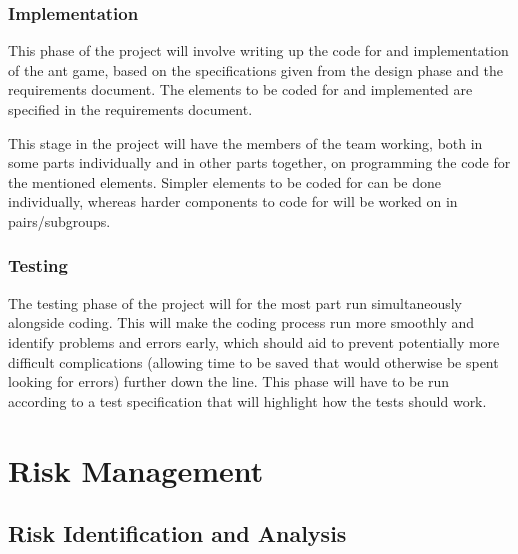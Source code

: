 \documentclass[11pt]{article}
\begin{document}
\subsubsection{Implementation}

This phase of the project will involve writing up the code for and implementation of the ant game, based on the specifications given from the design phase and the requirements document. The elements to be coded for and implemented are specified in the requirements document.

This stage in the project will have the members of the team working, both in some parts individually and in other parts together, on programming the code for the mentioned elements. Simpler elements to be coded for can be done individually, whereas harder components to code for will be worked on in pairs/subgroups.

\subsubsection{Testing}

The testing phase of the project will for the most part run simultaneously alongside coding. This will make the coding process run more smoothly and identify problems and errors early, which should aid to prevent potentially more difficult complications (allowing time to be saved that would otherwise be spent looking for errors) further down the line. This phase will have to be run according to a test specification that will highlight how the tests should work.

\newpage
\section{Risk Management}
\subsection{Risk Identification and Analysis}
\end{document}
